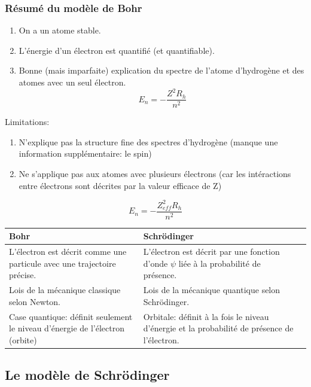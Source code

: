 \documentclass[10pt,a4paper]{book}
\begin{document}
\subsubsection{Résumé du modèle de Bohr}
\begin{enumerate}
\item On a un atome stable.
\item L'énergie d'un électron est quantifié (et quantifiable).
\item Bonne (mais imparfaite) explication du spectre de l’atome d’hydrogène et des atomes avec un seul électron.
\begin{displaymath}
E_n = -\frac{{Z^2}{R_h}}{n^2}
\end{displaymath}
\end{enumerate}
Limitations:
\begin{enumerate}
\item N'explique pas la structure fine des spectres d'hydrogène (manque une information supplémentaire: le spin)
\item Ne s'applique pas aux atomes avec plusieurs électrons (car les intéractions entre électrons sont décrites par la valeur efficace de Z)
\end{enumerate}
\begin{displaymath}
E_n = -\frac{{Z_{eff}^2}{R_h}}{n^2}
\end{displaymath}
\begin{center}
\begin{tabular}{ | m{5cm} | m{5cm}| m{5cm} | } 
  \hline
  Bohr & Schrödinger \\ 
  \hline
  L’électron est décrit comme une particule avec une trajectoire précise. & L'électron est décrit par une fonction d’onde $\psi$ liée à la probabilité de présence. \\ 
  \hline
  Lois de la mécanique classique selon Newton. & Lois de la mécanique quantique selon Schrödinger. \\ 
  \hline
  Case quantique: définit seulement le niveau d’énergie de l’électron (orbite) & Orbitale: définit à la fois le niveau d’énergie et la probabilité de présence de l'électron. \\
  \hline
\end{tabular}
\end{center}
\subsection{Le modèle de Schrödinger}
\end{document}
